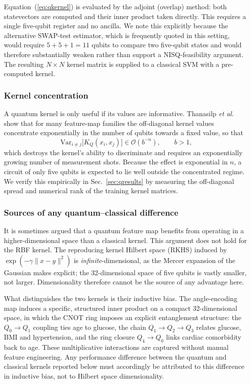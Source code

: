 \documentclass{ws-ijqi}
\begin{document}
Equation~(\ref{eq:qkernel}) is evaluated by the adjoint (overlap) method: both
statevectors are computed and their inner product taken directly. This requires
a single five-qubit register and no ancilla. We note this explicitly because
the alternative SWAP-test estimator, which is frequently quoted in this
setting, would require $5+5+1=11$ qubits to compare two five-qubit states and
would therefore substantially weaken rather than support a NISQ-feasibility
argument. The resulting $N\times N$ kernel matrix is supplied to a classical
SVM with a pre-computed kernel.

\subsubsection{Kernel concentration}

A quantum kernel is only useful if its values are informative. Thanasilp
\textit{et al.}\cite{thanasilp2024} show that for many feature-map families the
off-diagonal kernel values concentrate exponentially in the number of qubits
towards a fixed value, so that
\begin{equation}
\mathrm{Var}_{i\neq j}\big[K_Q(x_i,x_j)\big] \in \mathcal{O}(b^{-n}),
\qquad b>1 ,
\label{eq:conc}
\end{equation}
which destroys the kernel's ability to discriminate and requires an
exponentially growing number of measurement shots. Because the effect is
exponential in $n$, a circuit of only five qubits is expected to lie well
outside the concentrated regime. We verify this empirically in
Sec.~\ref{sec:qresults} by measuring the off-diagonal spread and numerical rank
of the training kernel matrices.

\subsubsection{Sources of any quantum--classical difference}
\label{sec:advantage}

It is sometimes argued that a quantum feature map benefits from operating in a
higher-dimensional space than a classical kernel. This argument does not hold
for the RBF kernel. The reproducing kernel Hilbert space (RKHS) induced by
$\exp(-\gamma\|x-y\|^2)$ is \emph{infinite}-dimensional, as the Mercer
expansion of the Gaussian makes explicit; the 32-dimensional space of five
qubits is vastly smaller, not larger. Dimensionality therefore cannot be the
source of any advantage here.

What distinguishes the two kernels is their inductive bias. The angle-encoding
map induces a specific, structured inner product on a compact 32-dimensional
space, in which the CNOT ring imposes an explicit entanglement structure: the
$Q_0\!\to\!Q_1$ coupling ties age to glucose, the chain
$Q_1\!\to\!Q_2\!\to\!Q_3$ relates glucose, BMI and hypertension, and the ring
closure $Q_4\!\to\!Q_0$ links cardiac comorbidity back to age. These
multiplicative interactions are captured without manual feature engineering.
Any performance difference between the quantum and classical kernels reported
below must accordingly be attributed to this difference in inductive bias, not
to Hilbert space dimensionality.
\end{document}
